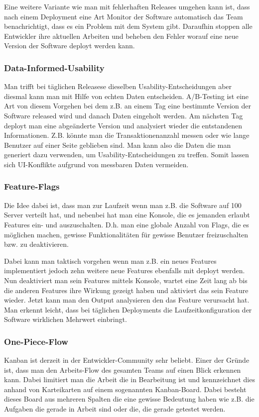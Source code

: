 Eine weitere Variante wie man mit fehlerhaften Releases umgehen kann ist, dass
nach einem Deployment eine Art Monitor der Software automatisch das Team
benachrichtigt, dass es ein Problem mit dem System gibt. Daraufhin stoppen
alle Entwickler ihre aktuellen Arbeiten und beheben den Fehler worauf eine
neue Version der Software deployt werden kann.

\subsubsection{Data-Informed-Usability}
Man trifft bei täglichen Releasese dieselben Usability-Entscheidungen aber
diesmal kann man mit Hilfe von echten Daten entscheiden. A/B-Testing ist eine
Art von diesem Vorgehen bei dem z.B. an einem Tag eine bestimmte Version der
Software released wird und danach Daten eingeholt werden. Am nächsten Tag
deployt man eine abgeänderte Version und analysiert wieder die entstandenen
Informationen. Z.B. könnte man die Transaktionenanzahl messen oder wie lange
Benutzer auf einer Seite geblieben sind. Man kann also die Daten die man
generiert dazu verwenden, um Usability-Entscheidungen zu treffen. Somit lassen
sich UI-Konflikte  aufgrund von messbaren Daten vermeiden.

\subsubsection{Feature-Flags}
Die Idee dabei ist, dass man zur Laufzeit wenn man z.B. die Software auf 100
Server verteilt hat, und nebenbei hat man eine Konsole, die es jemanden
erlaubt Features ein- und auszuschalten. D.h. man eine globale Anzahl von
Flags, die es möglichen machen, gewisse Funktionalitäten für gewisse Benutzer
freizuschalten bzw. zu deaktivieren.

Dabei kann man taktisch vorgehen wenn man z.B. ein neues Features
implementiert jedoch zehn weitere neue Features ebenfalls mit deployt werden.
Nun deaktiviert man sein Features mittels Konsole, wartet eine Zeit lang ab
bis die anderen Features ihre Wirkung gezeigt haben und aktiviert das sein
Feature wieder. Jetzt kann man den Output analysieren den das Feature
verursacht hat. Man erkennt leicht, dass bei täglichen Deployments die
Laufzeitkonfiguration der Software wirklichen Mehrwert einbringt.

\subsubsection{One-Piece-Flow}
Kanban ist derzeit in der Entwickler-Community sehr beliebt. Einer der Gründe
ist, dass man den Arbeits-Flow des gesamten Teams auf einen Blick erkennen
kann. Dabei limitiert man die Arbeit die in Bearbeitung ist und kennzeichnet
dies anhand von Karteikarten auf einem sogenannten Kanban-Board. Dabei besteht
dieses Board aus mehreren Spalten die eine gewisse Bedeutung haben wie z.B.
die Aufgaben die gerade in Arbeit sind oder die, die gerade getestet werden.

